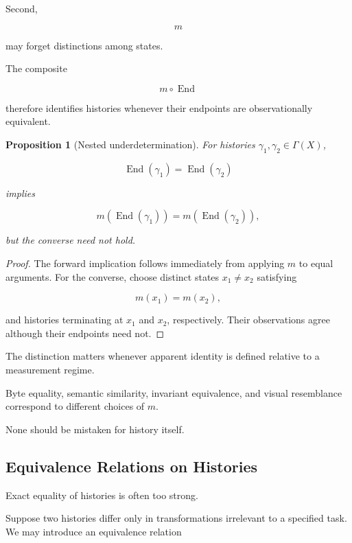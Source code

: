 \documentclass[
  11pt,
  a4paper,
  DIV=12,
  BCOR=0mm,
  parskip=half-
]{scrartcl}
\newcommand{\End}{\operatorname{End}}
\theoremstyle{definition}
\theoremstyle{plain}
\newtheorem{proposition}[definition]{Proposition}
\theoremstyle{remark}
\begin{document}
Second,

\[
  m
\]

may forget distinctions among states.

The composite

\[
  m\circ\End
\]

therefore identifies histories whenever their endpoints are observationally
equivalent.

\begin{proposition}[Nested underdetermination]
\label{prop:nested-underdetermination}
For histories \(\gamma_1,\gamma_2\in\Gamma(X)\),

\[
  \End(\gamma_1)=\End(\gamma_2)
\]

implies

\[
  m(\End(\gamma_1))
  =
  m(\End(\gamma_2)),
\]

but the converse need not hold.
\end{proposition}

\begin{proof}
The forward implication follows immediately from applying \(m\) to equal
arguments. For the converse, choose distinct states \(x_1\neq x_2\) satisfying

\[
  m(x_1)=m(x_2),
\]

and histories terminating at \(x_1\) and \(x_2\), respectively. Their
observations agree although their endpoints need not.
\end{proof}

The distinction matters whenever apparent identity is defined relative to a
measurement regime.

Byte equality, semantic similarity, invariant equivalence, and visual
resemblance correspond to different choices of \(m\).

None should be mistaken for history itself.


\subsection{Equivalence Relations on Histories}
\label{app:trajectory-equivalence}

Exact equality of histories is often too strong.

Suppose two histories differ only in transformations irrelevant to a specified
task. We may introduce an equivalence relation
\end{document}
